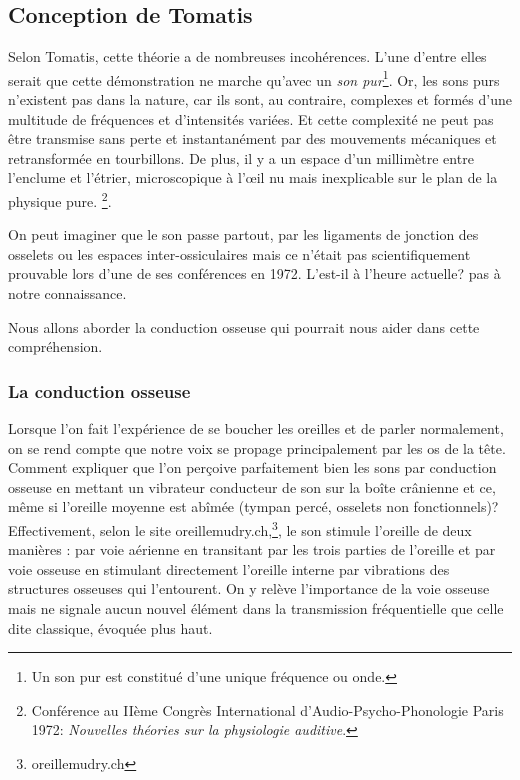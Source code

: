 \subsection{Conception de Tomatis}
 
Selon Tomatis, cette théorie a de nombreuses incohérences. L'une
d'entre elles serait que cette démonstration ne marche qu'avec un
\emph{son pur}\footnote{Un son pur est constitué d'une unique fréquence ou onde.}.
Or, les sons purs n'existent pas dans la nature, car ils sont, au
contraire, complexes et formés d'une multitude de fréquences et d'intensités
variées. Et cette complexité ne peut pas être transmise sans perte
et instantanément par des mouvements mécaniques et retransformée en
tourbillons. De plus, il y a un espace d'un millimètre entre l'enclume et l'étrier,
microscopique à l'\oe il nu mais  inexplicable sur le plan de la
physique pure.%
\footnote{Conférence au IIème Congrès International d'Audio-Psycho-Phonologie
Paris 1972:  \emph{Nouvelles théories sur la physiologie auditive}.}.
 
 On peut imaginer que le son passe
partout, par les ligaments de jonction des osselets ou les espaces
inter-ossiculaires mais %
ce n'était pas scientifiquement prouvable lors d'une de ses conférences
en 1972. L'est-il à l'heure actuelle? pas à notre connaissance. 

Nous allons aborder la conduction osseuse qui pourrait nous aider
dans cette compréhension.

\subsubsection{La conduction osseuse}

Lorsque l'on fait l'expérience de se
boucher les oreilles et de parler normalement, on se rend compte que
notre voix se propage principalement par les os de la tête. Comment
expliquer que l'on perçoive parfaitement bien les sons par conduction
osseuse en mettant un vibrateur conducteur de son sur la boîte crânienne et ce, même si l'oreille moyenne est abîmée (tympan percé, osselets non fonctionnels)?
Effectivement, selon le site oreillemudry.ch,\footnote{oreillemudry.ch}, 
le son stimule l'oreille de deux manières : par voie aérienne en transitant
par les trois parties de l'oreille et par voie osseuse en stimulant
directement l'oreille interne par vibrations des structures osseuses
qui l'entourent. On y relève l'importance de la voie osseuse
mais ne signale aucun nouvel élément dans la transmission
fréquentielle que celle dite classique, évoquée plus haut.
 
